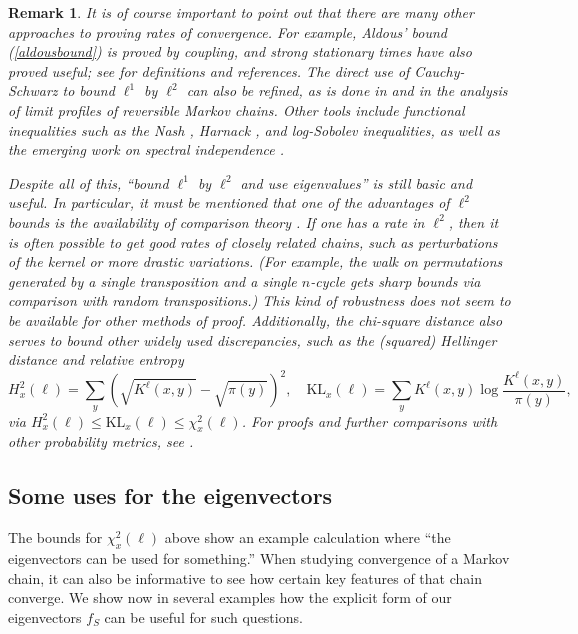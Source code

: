 \documentclass[11pt]{article}
\newcounter{r}
\newcounter{s}
\numberwithin{equation}{section}
\newtheorem*{remark}{Remark}
\begin{document}
\begin{remark}
It is of course important to point out that there are many other approaches to proving rates of convergence. For example, Aldous' bound (\cref{aldousbound}) is proved by coupling, and strong stationary times have also proved useful; see \cite[Chapters 5 and 6]{levinperes} for definitions and references. The direct use of Cauchy-Schwarz to bound $\ell^1$ by $\ell^2$ can also be refined, as is done in \cite{teyssierlimitprofile} and \cite{nestoridilimitprofile} in the analysis of limit profiles of reversible Markov chains. Other tools include functional inequalities such as the Nash \cite{nashineq}, Harnack \cite{harnack}, and log-Sobolev \cite{logsobolev} inequalities, as well as the emerging work on spectral independence \cite{spectralindependence}. 

Despite all of this, ``bound $\ell^1$ by $\ell^2$ and use eigenvalues'' is still basic and useful. In particular, it must be mentioned that one of the advantages of $\ell^2$ bounds is the availability of comparison theory \cite{comparisontheory}. If one has a rate in $\ell^2$, then it is often possible to get good rates of closely related chains, such as perturbations of the kernel or more drastic variations. (For example, the walk on permutations generated by a single transposition and a single $n$-cycle gets sharp bounds via comparison with random transpositions.) This kind of robustness does not seem to be available for other methods of proof. Additionally, the chi-square distance also serves to bound other widely used discrepancies, such as the (squared) Hellinger distance and relative entropy
\[
    H^2_x(\ell) = \sum_y \left(\sqrt{K^\ell(x, y)} - \sqrt{\pi(y)}\right)^2, \quad \text{KL}_x(\ell) = \sum_y K^\ell(x, y) \log \frac{K^\ell(x, y)}{\pi(y)},
\]
via $H^2_x(\ell) \le \text{KL}_x(\ell) \le \chi_x^2(\ell)$. For proofs and further comparisons with other probability metrics, see \cite{choosemetric}.
\end{remark}

\subsection{Some uses for the eigenvectors}\label{eigenvectorsusesubsection}

The bounds for $\chi_x^2(\ell)$ above show an example calculation where ``the eigenvectors can be used for something.'' When studying convergence of a Markov chain, it can also be informative to see how certain key features of that chain converge. We show now in several examples how the explicit form of our eigenvectors $f_S$ can be useful for such questions. 
\end{document}
